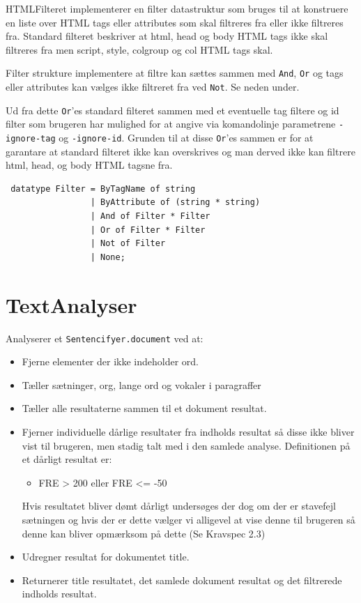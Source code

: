 \documentclass[a4paper,oneside,article]{memoir}
\begin{document}
HTMLFilteret implementerer en filter datastruktur som bruges til at
konstruere en liste over HTML tags eller attributes som skal filtreres
fra eller ikke filtreres fra.  Standard filteret beskriver at html,
head og body HTML tags ikke skal filtreres fra men script, style,
colgroup og col HTML tags skal.

Filter strukture implementere at filtre kan sættes sammen med
\texttt{And}, \texttt{Or} og tags eller attributes kan vælges ikke
filtreret fra ved \texttt{Not}. Se neden under.

Ud fra dette \texttt{Or}'es standard filteret sammen med et eventuelle
tag filtere og id filter som brugeren har mulighed for at angive via
komandolinje parametrene \texttt{-ignore-tag} og
\texttt{-ignore-id}. Grunden til at disse \texttt{Or}'es sammen er for
at garantare at standard filteret ikke kan overskrives og man derved
ikke kan filtrere html, head, og body HTML tagsne fra.

\begin{lstlisting}
 datatype Filter = ByTagName of string
                 | ByAttribute of (string * string)
                 | And of Filter * Filter
                 | Or of Filter * Filter
                 | Not of Filter
                 | None;
\end{lstlisting}


\section{TextAnalyser}

Analyserer et \texttt{Sentencifyer.document} ved at:
\begin{itemize}
 \item Fjerne elementer der ikke indeholder ord.
 \item Tæller sætninger, org, lange ord og vokaler i paragraffer
 \item Tæller alle resultaterne sammen til et dokument resultat.
 \item Fjerner individuelle dårlige resultater fra indholds resultat
   så disse ikke bliver vist til brugeren, men stadig talt med i den
   samlede analyse. Definitionen på et dårligt resultat er:
   \begin{itemize}
   \item FRE > 200 eller FRE <= -50
   \end{itemize}
   Hvis resultatet bliver dømt dårligt undersøges der dog om der er
   stavefejl sætningen og hvis der er dette vælger vi alligevel at
   vise denne til brugeren så denne kan bliver opmærksom på dette (Se
   Kravspec 2.3)
 \item Udregner resultat for dokumentet title.
 \item Returnerer title resultatet, det samlede dokument resultat og det filtrerede indholds resultat.
\end{itemize}
\end{document}
